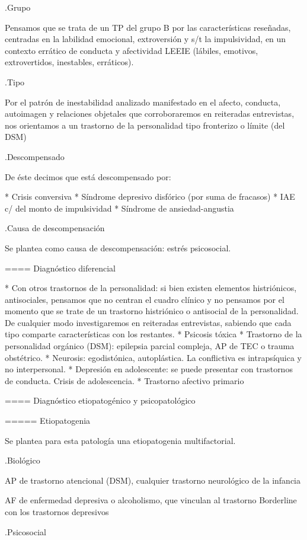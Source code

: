 \documentclass[encares.tex]{subfiles}
\begin{document}
.Grupo

Pensamos que se trata de un TP del grupo B por las características reseñadas, centradas en la labilidad emocional, extroversión y s/t la impulsividad, en un contexto errático de conducta y afectividad LEEIE (lábiles, emotivos, extrovertidos, inestables, erráticos).

.Tipo

Por el patrón de inestabilidad analizado manifestado en el afecto, conducta, autoimagen y relaciones objetales que corroboraremos en reiteradas entrevistas, nos orientamos a un trastorno de la personalidad tipo fronterizo o límite (del DSM)

.Descompensado

De éste decimos que está descompensado por:

* Crisis conversiva
* Síndrome depresivo disfórico (por suma de fracasos)
* IAE c/ del monto de impulsividad
* Síndrome de ansiedad-angustia

.Causa de descompensación

Se plantea como causa de descompensación: estrés psicosocial.

==== Diagnóstico diferencial

* Con otros trastornos de la personalidad: si bien existen elementos histriónicos, antisociales, pensamos que no centran el cuadro clínico y no pensamos por el momento que se trate de un trastorno histriónico o antisocial de la personalidad. De cualquier modo investigaremos en reiteradas entrevistas, sabiendo que cada tipo comparte características con los restantes.
* Psicosis tóxica
* Trastorno de la personalidad orgánico (DSM): epilepsia parcial compleja, AP de TEC o trauma obstétrico.
* Neurosis: egodistónica, autoplástica. La conflictiva es intrapsíquica y no interpersonal.
* Depresión en adolescente: se puede presentar con trastornos de conducta. Crisis de adolescencia.
* Trastorno afectivo primario

==== Diagnóstico etiopatogénico y psicopatológico

===== Etiopatogenia

Se plantea para esta patología una etiopatogenia multifactorial.

.Biológico

AP de trastorno atencional (DSM), cualquier trastorno neurológico de la infancia

AF de enfermedad depresiva o alcoholismo, que vinculan al trastorno Borderline con los trastornos depresivos

.Psicosocial
\end{document}
